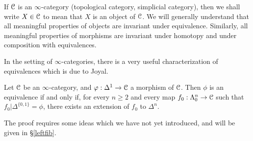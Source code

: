 \begin{1.2.4 Objects, morphisms, equivalences}
If $\operatorname{\mathcal{C}}$ is an $\infty$-category (topological category, simplicial category), then we
shall write $X \in \operatorname{\mathcal{C}}$ to mean that $X$ is an object of
$\operatorname{\mathcal{C}}$. We will generally understand that all meaningful properties of
objects are invariant under equivalence. Similarly, all
meaningful properties of morphisms are invariant under
homotopy and under composition with equivalences.

In the setting of $\infty$-categories, there is a very useful characterization of equivalences which is due to Joyal.

\begin{proposition}\label{greenlem}
Let $\operatorname{\mathcal{C}}$ be an $\infty$-category, and $\varphi: \Delta^1 \rightarrow \operatorname{\mathcal{C}}$ a morphism of $\operatorname{\mathcal{C}}$. Then $\phi$ is an equivalence if and only if, for every $n \geq 2$ and every map
$f_0: \Lambda^n_0 \rightarrow \operatorname{\mathcal{C}}$ such that $f_0 | \Delta^{\{0,1\}} = \phi$,
there exists an extension of $f_0$ to $\Delta^n$.
\end{proposition}

The proof requires some ideas which we have not yet introduced, and will be given in \S \ref{leftfib}.
\end{1.2.4 Objects, morphisms, equivalences}
